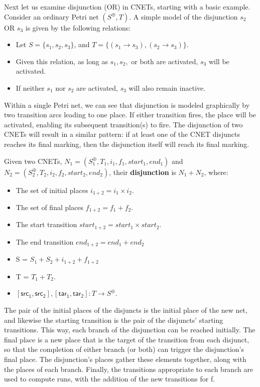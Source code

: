 \begin{example}
  \label{ex:OR-PN}
Next let us examine disjunction (OR) in CNETs, starting with a basic example. Consider an ordinary Petri net $(S^\oplus, T)$. A simple model of the disjunction $s_2$ OR $s_3$ is given by the following relations:
  \begin{itemize}
  \item Let $S = \{s_1, s_2, s_3\}$, and $T = \{(s_1 \to s_3), (s_2 \to s_3)\}$. 
  \item Given this relation, as long as $s_1, s_2,$ or both are activated, $s_3$ will be activated. 
  \item If neither $s_1$ nor $s_2$ are activated, $s_3$ will also remain inactive.  
  \end{itemize}
Within a single Petri net, we can see that disjunction is modeled
graphically by two transition arcs leading to one place. If either 
transition fires, the place will be activated, enabling its subsequent
transition(s) to fire. The disjunction of two CNETs will result in a
similar pattern: if at least one of the CNET disjuncts reaches its
final marking, then the disjunction itself will reach its final
marking.
\end{example}

\begin{definition}
  \label{def:OR-PN}
  Given two CNETs, $N_1= (S_1^\oplus, T_1, i_1, f_1, start_1, end_1)$ and $N_2= (S_2^\oplus, T_2, i_2, f_2, start_2, end_2)$, their \textbf{disjunction} is $N_1 + N_2$, where:  
  \begin{itemize}
  \item The set of initial places $i_{1+2} = i_1 \times i_2$.
  \item The set of final places $f_{1+2} = f_1 + f_2$.
  \item The start transition $start_{1+2} = start_1 \times start_2$.
  \item The end transition $end_{1+2} = end_1 + end_2$ 
  \item S = $S_1 + S_2 + i_{1+2} + f_{1+2}$ 
  \item T = $T_1 + T_2$.
  \item $[\mathsf{src_1}, \mathsf{src_2}], [\mathsf{tar_1}, \mathsf{tar_2}]: T\to S^\oplus$. 
  \end{itemize}  
  The pair of the initial places of the disjuncts is the initial place of the new net, and likewise the starting transition is the pair of the disjuncts' starting transitions. This way, each branch of the disjunction
  can be reached initially. The final place is a new place that is the
  target of the transition from each disjunct, so that the completion of
  either branch (or both) can trigger the disjunction's final place. The
  disjunction's places gather these elements together, along with the
  places of each branch. Finally, the transitions appropriate
  to each branch are used to compute runs, with the addition of the new
  transitions for f.
\end{definition}

